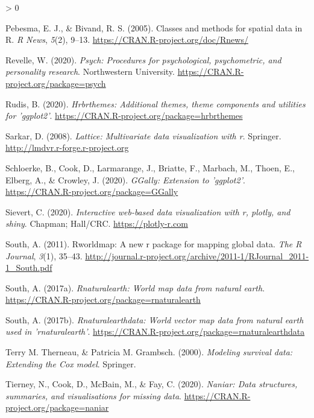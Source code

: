 \documentclass[
  american,
  man]{apa7}
\newlength{\cslhangindent}
\newenvironment{CSLReferences}[2] %
 {%
  \setlength{\parindent}{0pt}
  \ifodd #1 \everypar{\setlength{\hangindent}{\cslhangindent}}\ignorespaces\fi
  \ifnum #2 > 0
  \setlength{\parskip}{#2\baselineskip}
  \fi
 }%
 {}
\begin{document}
\begin{CSLReferences}{1}{0}
\leavevmode\hypertarget{ref-R-sp}{}%
Pebesma, E. J., \& Bivand, R. S. (2005). Classes and methods for spatial data in {R}. \emph{R News}, \emph{5}(2), 9--13. \url{https://CRAN.R-project.org/doc/Rnews/}

\leavevmode\hypertarget{ref-R-psych}{}%
Revelle, W. (2020). \emph{Psych: Procedures for psychological, psychometric, and personality research}. Northwestern University. \url{https://CRAN.R-project.org/package=psych}

\leavevmode\hypertarget{ref-R-hrbrthemes}{}%
Rudis, B. (2020). \emph{Hrbrthemes: Additional themes, theme components and utilities for 'ggplot2'}. \url{https://CRAN.R-project.org/package=hrbrthemes}

\leavevmode\hypertarget{ref-R-lattice}{}%
Sarkar, D. (2008). \emph{Lattice: Multivariate data visualization with r}. Springer. \url{http://lmdvr.r-forge.r-project.org}

\leavevmode\hypertarget{ref-R-GGally}{}%
Schloerke, B., Cook, D., Larmarange, J., Briatte, F., Marbach, M., Thoen, E., Elberg, A., \& Crowley, J. (2020). \emph{GGally: Extension to 'ggplot2'}. \url{https://CRAN.R-project.org/package=GGally}

\leavevmode\hypertarget{ref-R-plotly}{}%
Sievert, C. (2020). \emph{Interactive web-based data visualization with r, plotly, and shiny}. Chapman; Hall/CRC. \url{https://plotly-r.com}

\leavevmode\hypertarget{ref-R-rworldmap}{}%
South, A. (2011). Rworldmap: A new r package for mapping global data. \emph{The R Journal}, \emph{3}(1), 35--43. \url{http://journal.r-project.org/archive/2011-1/RJournal_2011-1_South.pdf}

\leavevmode\hypertarget{ref-R-rnaturalearth}{}%
South, A. (2017a). \emph{Rnaturalearth: World map data from natural earth}. \url{https://CRAN.R-project.org/package=rnaturalearth}

\leavevmode\hypertarget{ref-R-rnaturalearthdata}{}%
South, A. (2017b). \emph{Rnaturalearthdata: World vector map data from natural earth used in 'rnaturalearth'}. \url{https://CRAN.R-project.org/package=rnaturalearthdata}

\leavevmode\hypertarget{ref-R-survival-book}{}%
Terry M. Therneau, \& Patricia M. Grambsch. (2000). \emph{Modeling survival data: Extending the {C}ox model}. Springer.

\leavevmode\hypertarget{ref-R-naniar}{}%
Tierney, N., Cook, D., McBain, M., \& Fay, C. (2020). \emph{Naniar: Data structures, summaries, and visualisations for missing data}. \url{https://CRAN.R-project.org/package=naniar}


\end{CSLReferences}
\end{document}
